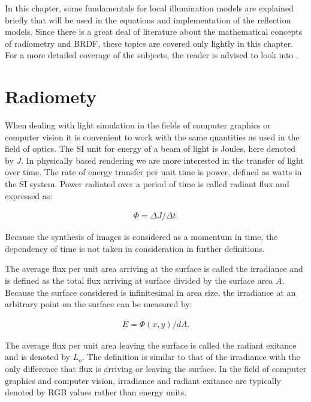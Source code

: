 \hypertarget{Fundamentals}{
}

In this chapter, some fundamentals for local illumination models are explained briefly that will be used in the equations and implementation of the reflection models. Since there is a great deal of literature about the mathematical concepts of radiometry and BRDF, these topics are covered only lightly in this chapter. For a more detailed coverage of the subjects, the reader is advised to look into \cite{RTR} \cite{GlobalIllumination} \cite{DigitalModeling}.

\section{Radiomety}

When dealing with light simulation in the fields of computer graphics or computer vision it is convenient to work with the same quantities as used in the field of optics. The SI unit for energy of a beam of light is Joules, here denoted by $J$. In physically based rendering we are more interested in the transfer of light over time. The rate of energy transfer per unit time is power, defined as watts in the SI system. Power radiated over a period of time is called radiant flux and expressed as: 

		\begin{eqnarray*}
			\Phi = \Delta J / \Delta t. 
		\end{eqnarray*}

Because the synthesis of images is considered as a momentum in time, the dependency of time is not taken in consideration in further definitions.

The average flux per unit area arriving at the surface is called the irradiance and is defined as the total flux arriving at surface divided by the surface area $A$. Because the surface considered is infinitesimal in area size, the irradiance at an arbitrary point on the surface can be measured by:

		\begin{eqnarray*}
			E = \Phi(x,y) / dA. 
		\end{eqnarray*}

The average flux per unit area leaving the surface is called the radiant exitance and is denoted by $L_o$. The definition is similar to that of the irradiance with the only difference that flux is arriving or leaving the surface. In the field of computer graphics and computer vision, irradiance and radiant exitance are typically denoted by RGB values rather than energy units.

